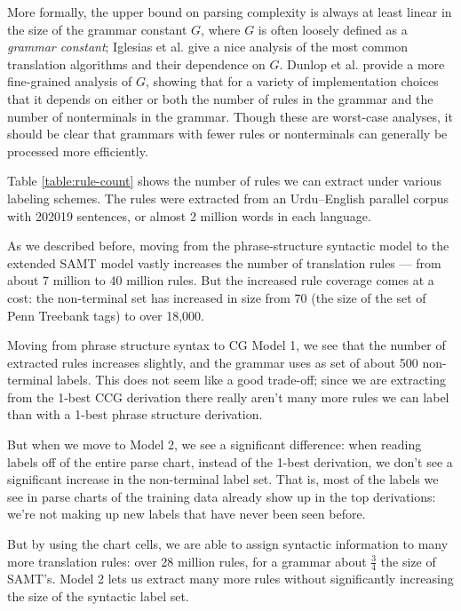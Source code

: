 \documentclass{article}
\begin{document}
More formally, the upper bound on parsing complexity is always at
least linear in the size of the grammar constant $G$, where $G$ is
often loosely defined as a {\it grammar constant}; Iglesias et al.
 give a nice analysis of the most common translation algorithms
and their dependence on $G$. Dunlop et al.  provide a more
fine-grained analysis of $G$, showing that for a variety of
implementation choices that it depends on either or both the number of
rules in the grammar and the number of nonterminals in the grammar.
Though these are worst-case analyses, it should be clear that grammars
with fewer rules or nonterminals can generally be processed more
efficiently.

Table \ref{table:rule-count} shows the number of rules we can extract under various labeling schemes. The rules were extracted from an Urdu--English parallel corpus with 202019 sentences, or almost 2 million words in each language.

As we described before, moving from the phrase-structure syntactic model to the extended SAMT model vastly increases the number of translation rules --- from about 7 million to 40 million rules. But the increased rule coverage comes at a cost: the non-terminal set has increased in size from 70 (the size of the set of Penn Treebank tags) to over 18,000.

Moving from phrase structure syntax to CG Model 1, we see that the number of extracted rules increases slightly, and the grammar uses as set of about 500 non-terminal labels. This does not seem like a good trade-off; since we are extracting from the 1-best CCG derivation there really aren't many more rules we can label than with a 1-best phrase structure derivation.

But when we move to Model 2, we see a significant difference: when reading labels off of the entire parse chart, instead of the 1-best derivation, we don't see a significant increase in the non-terminal label set. That is, most of the labels we see in parse charts of the training data already show up in the top derivations: we're not making up new labels that have never been seen before.

But by using the chart cells, we are able to assign syntactic information to many more translation rules: over 28 million rules, for a grammar about $\frac{3}{4}$ the size of SAMT's. Model 2 lets us extract many more rules without significantly increasing the size of the syntactic label set.
\end{document}
